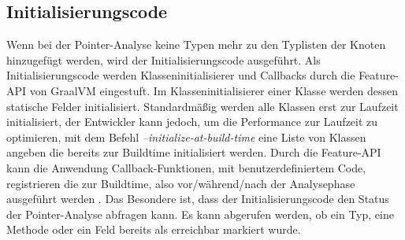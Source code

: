 \subsection{Initialisierungscode}
\label{subsec:initializationcode}
Wenn bei der Pointer-Analyse keine Typen mehr zu den Typlisten der Knoten hinzugefügt werden, wird der Initialisierungscode ausgeführt. Als Initialisierungscode werden Klasseninitialisierer und Callbacks durch die Feature-API von GraalVM eingestuft.
Im Klasseninitialisierer einer Klasse werden dessen statische Felder initialisiert. Standardmäßig werden alle Klassen erst zur Laufzeit initialisiert, der Entwickler kann jedoch, um die Performance zur Laufzeit zu optimieren, mit dem Befehl \textit{--initialize-at-build-time} eine Liste von Klassen angeben die bereits zur Buildtime initialisiert werden\parencite[Ab Version 19.0]{Wimmer2019Medium}.
Durch die Feature-API kann die Anwendung Callback-Funktionen, mit benutzerdefiniertem Code, registrieren die zur Buildtime, also vor/während/nach der Analysephase ausgeführt werden \parencite{GraalVM}. Das Besondere ist, dass der Initialisierungscode den Status der Pointer-Analyse abfragen kann. Es kann abgerufen werden, ob ein Typ, eine Methode oder ein Feld bereits als \glqq erreichbar\grqq{} markiert wurde.
